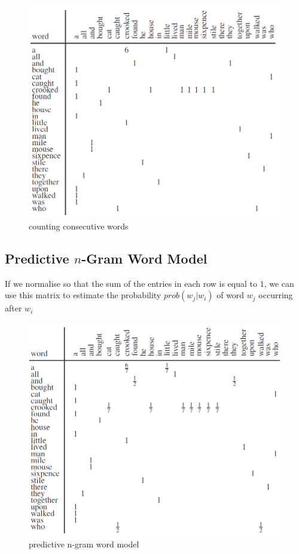 \documentclass[11pt]{article}
\begin{document}
\begin{figure}[H]
    \centering
    \includegraphics{../out/images/counting-consecutive-words}
    \caption[counting consecutive words]{counting consecutive words}
    \label{fig:counting consecutive words}
\end{figure}

\subsection{Predictive $n$-Gram Word Model}\label{subsec:predictive-$n$-gram-word-model}
If we normalise so that the sum of the entries in each row is equal to $1$, we
can use this matrix to estimate the probability $prob(w_j | w_i)$ of word $w_j$
occurring after $w_i$

\begin{figure}[H]
    \centering
    \includegraphics{../out/images/predictive-n-gram-word-model}
    \caption[predictive n-gram word model]{predictive n-gram word model}
    \label{fig:predictive n-gram word model}
\end{figure}
\end{document}
